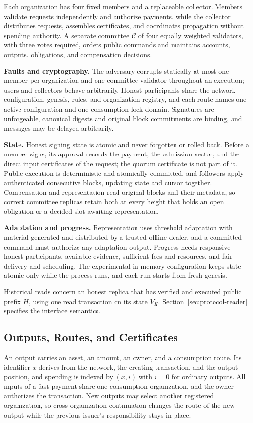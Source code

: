Each organization has four fixed members and a replaceable collector. Members validate requests independently and authorize payments, while the collector distributes requests, assembles certificates, and coordinates propagation without spending authority. A separate committee $\mathcal C$ of four equally weighted validators, with three votes required, orders public commands and maintains accounts, outputs, obligations, and compensation decisions.

\noindent\textbf{Faults and cryptography.}
The adversary corrupts statically at most one member per organization and one committee validator throughout an execution; users and collectors behave arbitrarily. Honest participants share the network configuration, genesis, rules, and organization registry, and each route names one active configuration and one consumption-lock domain. Signatures are unforgeable, canonical digests and original block commitments are binding, and messages may be delayed arbitrarily.

\noindent\textbf{State.}
Honest signing state is atomic and never forgotten or rolled back. Before a member signs, its approval records the payment, the admission vector, and the direct input certificates of the request; the quorum certificate is not part of it. Public execution is deterministic and atomically committed, and followers apply authenticated consecutive blocks, updating state and cursor together. Compensation and representation read original blocks and their metadata, so correct committee replicas retain both at every height that holds an open obligation or a decided slot awaiting representation.

\noindent\textbf{Adaptation and progress.}
Representation uses threshold adaptation with material generated and distributed by a trusted offline dealer, and a committed command must authorize any adaptation output. Progress needs responsive honest participants, available evidence, sufficient fees and resources, and fair delivery and scheduling. The experimental in-memory configuration keeps state atomic only while the process runs, and each run starts from fresh genesis.

Historical reads concern an honest replica that has verified and executed public prefix $H$, using one read transaction on its state $V_H$. Section~\ref{sec:protocol-reader} specifies the interface semantics.

\subsection{Outputs, Routes, and Certificates}
\label{sec:model-certificates}
An output carries an asset, an amount, an owner, and a consumption route. Its identifier $x$ derives from the network, the creating transaction, and the output position, and spending is indexed by $(x,i)$ with $i=0$ for ordinary outputs. All inputs of a fast payment share one consumption organization, and the owner authorizes the transaction. New outputs may select another registered organization, so cross-organization continuation changes the route of the new output while the previous issuer's responsibility stays in place.

